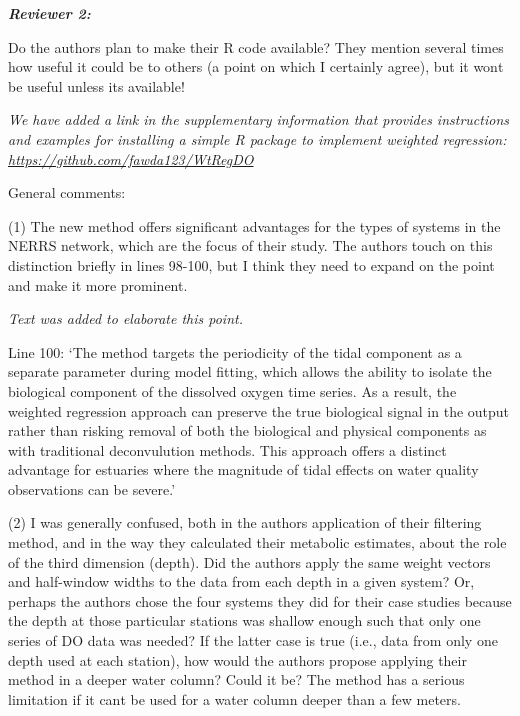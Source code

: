 \documentclass[letterpaper,12pt]{article}\usepackage[]{graphicx}\usepackage[]{color}
\newcommand{\Bigtxt}[1]{\textbf{\textit{#1}}}
\begin{document}
\Bigtxt{Reviewer 2:}

Do the authors plan to make their R code available? They mention several times how useful it could be to others (a point on which I certainly agree), but it wont be useful unless its available!

{\it We have added a link in the supplementary information that provides instructions and examples for installing a simple R package to implement weighted regression: \href{https://github.com/fawda123/WtRegDO}{https://github.com/fawda123/WtRegDO}}

General comments:

(1) The new method offers significant advantages for the types of systems in the NERRS network, which are the focus of their study. The authors touch on this distinction briefly in lines 98-100, but I think they need to expand on the point and make it more prominent.

{\it Text was added to elaborate this point.

Line 100: `The method targets the periodicity of the tidal component as a separate parameter during model fitting, which allows the ability to isolate the biological component of the dissolved oxygen time series.  As a result, the weighted regression approach can preserve the true biological signal in the output rather than risking removal of both the biological and physical components as with traditional deconvulution methods.  This approach offers a distinct advantage for estuaries where the magnitude of tidal effects on water quality observations can be severe.'
}

(2) I was generally confused, both in the authors application of their filtering method, and in the way they calculated their metabolic estimates, about the role of the third dimension (depth). Did the authors apply the same weight vectors and half-window widths to the data from each depth in a given system? Or, perhaps the authors chose the four systems they did for their case studies because the depth at those particular stations was shallow enough such that only one series of DO data was needed? If the latter case is true (i.e., data from only one depth used at each station), how would the authors propose applying their method in a deeper water column? Could it be? The method has a serious limitation if it cant be used for a water column deeper than a few meters.
\end{document}
